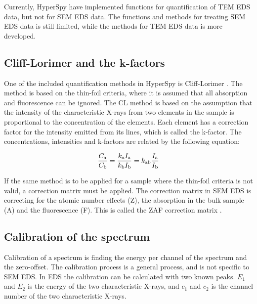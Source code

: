 Currently, HyperSpy have implemented functions for quantification of TEM EDS data, but not for SEM EDS data.
The functions and methods for treating SEM EDS data is still limited, while the methods for TEM EDS data is more developed.








%
% 
\subsection{Cliff-Lorimer and the k-factors}
\label{sec:theory:empirical:kfactors}

One of the included quantification methods in HyperSpy is Cliff-Lorimer \cite{CL1975}.
The method is based on the thin-foil criteria, where it is assumed that all absorption and fluorescence can be ignored.
The CL method is based on the assumption that the intensity of the characteristic X-rays from two elements in the sample is proportional to the concentration of the elements.
Each element has a correction factor for the intensity emitted from its lines, which is called the k-factor.
The concentrations, intensities and k-factors are related by the following equation:

\begin{equation}
    \frac{C_\textnormal{a}}{C_\textnormal{b}} = \frac{k_\textnormal{a} I_\textnormal{a}}{k_\textnormal{b} I_\textnormal{b}} = k_\textnormal{ab}  \frac{I_\textnormal{a}}{I_\textnormal{b}}
\end{equation}

If the same method is to be applied for a sample where the thin-foil criteria is not valid, a correction matrix must be applied.
The correction matrix in SEM EDS is correcting for the atomic number effects (Z), the absorption in the bulk sample (A) and the fluorescence (F).
This is called the ZAF correction matrix \cite{ZAF_1978}.

%
\subsection{Calibration of the spectrum}
\label{sec:theory:calibration}


Calibration of a spectrum is finding the energy per channel of the spectrum and the zero-offset.
The calibration process is a general process, and is not specific to SEM EDS.
In EDS the calibration can be calculated with two known peaks.
$E_1$ and $E_2$ is the energy of the two characteristic X-rays, and $c_1$ and $c_2$ is the channel number of the two characteristic X-rays.

